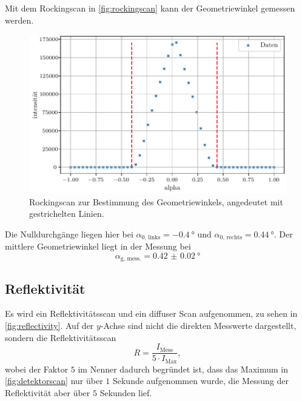 Mit dem Rockingscan in \autoref{fig:rockingscan} kann der Geometriewinkel gemessen werden.

\begin{figure}[H]
    \centering
    \includegraphics[width=\textwidth]{plots/rockingscan.pdf}
    \caption{Rockingscan zur Bestimmung des Geometriewinkels, angedeutet mit gestrichelten Linien.}
    \label{fig:rockingscan}
\end{figure}

Die Nulldurchgänge liegen hier bei $\alpha_{0\text{, links}} = \qty{-0.4}{\degree}$ und $\alpha_{0\text{, rechts}} = \qty{0.44}{\degree}$.
Der mittlere Geometriewinkel liegt in der Messung bei 
\begin{equation*}
    \alpha_\text{g, mess.} = \qty{0.42(2)}{\degree}
\end{equation*}

\subsection{Reflektivität}

Es wird ein Reflektivitätsscan und ein diffuser Scan aufgenommen, zu sehen in \autoref{fig:reflectivity}. Auf der $y$-Achse sind nicht die direkten Messwerte dargestellt, sondern die Reflektivitätsscan
\begin{equation*}
    R = \frac{I_\text{Mess}}{5\cdot I_\text{Max}},
\end{equation*}
wobei der Faktor $5$ im Nenner dadurch begründet ist, dass das Maximum in \autoref{fig:detektorscan} nur über $1$ Sekunde aufgenommen wurde, die Messung der Reflektivität aber über $5$ Sekunden lief.

